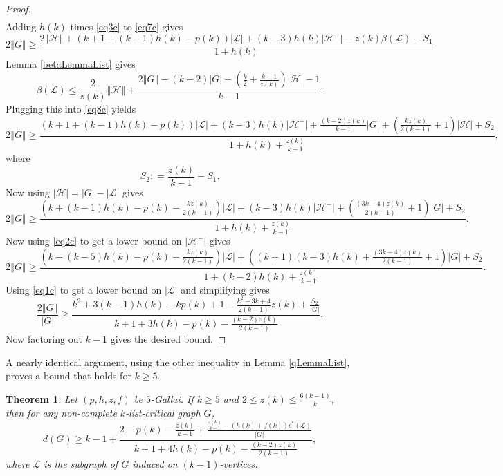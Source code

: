 \documentclass[10pt]{article}
\renewcommand{\ge}{\geqslant}
\renewcommand{\le}{\leqslant}
\theoremstyle{plain}
\newtheorem{thm}{Theorem}[section]
\theoremstyle{definition}
\theoremstyle{remark}
\newcommand{\fancy}[1]{\mathcal{#1}}
\renewcommand{\L}{\fancy{L}}
\newcommand{\HH}{\fancy{H}}
\newcommand{\card}[1]{\left|#1\right|}
\newcommand{\size}[1]{\left\Vert#1\right\Vert}
\newcommand{\parens}[1]{\left( #1 \right)}
\newcommand{\DefinedAs}{\mathrel{\mathop:}=}
\begin{document}
\begin{proof}
\begin{align*}
\end{align*}
Adding $h(k)$ times \eqref{eq3c} to \eqref{eq7c} gives
\begin{equation}\label{eq8c}
2\size{G} \ge \frac{2\size{\HH} + \parens{k+1 +(k-1)h(k)- p(k)}\card{\L} + (k- 3)h(k)\card{\HH^-}  - z(k)\beta(\L) - S_1}{1 + h(k)}
\end{equation}
Lemma \ref{betaLemmaList} gives
\[\beta(\L) \le \frac{2}{z(k)}\size{\HH} + \frac{2\size{G} - (k-2)\card{G} - \parens{\frac{k}{2} + \frac{k-1}{z(k)}}\card{\HH} - 1}{k-1}.\]
Plugging this into \eqref{eq8c} yields
\begin{equation}\label{eq9c}
2\size{G} \ge \frac{\parens{k+1 +(k-1)h(k)- p(k)}\card{\L} + (k- 3)h(k)\card{\HH^-} +\frac{(k-2)z(k)}{k-1}\card{G} + \parens{\frac{kz(k)}{2(k-1)} + 1}\card{\HH} + S_2}{1 + h(k) + \frac{z(k)}{k-1}},
\end{equation}
where
\[S_2 \DefinedAs \frac{z(k)}{k-1} - S_1.\]
Now using $\card{\HH} = \card{G} - \card{\L}$ gives
\begin{equation}\label{eq10c}
2\size{G} \ge \frac{\parens{k +(k-1)h(k)- p(k) - \frac{kz(k)}{2(k-1)}}\card{\L} + (k- 3)h(k)\card{\HH^-} + \parens{\frac{(3k-4)z(k)}{2(k-1)} + 1}\card{G} + S_2}{1 + h(k) + \frac{z(k)}{k-1}}.
\end{equation}
Now using \eqref{eq2c} to get a lower bound on $\card{\HH^-}$ gives
\begin{equation}\label{eq11c}
2\size{G} \ge \frac{\parens{k - (k-5)h(k)- p(k) - \frac{kz(k)}{2(k-1)}}\card{\L}+\parens{(k+1)(k-3)h(k) + \frac{(3k-4)z(k)}{2(k-1)} + 1}\card{G} + S_2}{1 + (k-2)h(k) + \frac{z(k)}{k-1}}.
\end{equation}
Using \eqref{eq1c} to get a lower bound on $\card{\L}$ and simplifying gives
\begin{equation}\label{eq12c}
\frac{2\size{G}}{\card{G}} \ge \frac{k^2 + 3(k-1)h(k) - kp(k) + 1 - \frac{k^2-3k+4}{2(k-1)}z(k) + \frac{S_2}{\card{G}}}{k+1 + 3h(k) - p(k) - \frac{(k-2)z(k)}{2(k-1)}}.
\end{equation}
Now factoring out $k-1$ gives the desired bound.
\end{proof}

\noindent A nearly identical argument, using the other inequality in Lemma \ref{qLemmaList}, proves a bound that holds for $k \ge 5$.

\begin{thm}\label{k5}
	Let $\parens{p,h,z,f}$ be $5$-Gallai.  If $k \ge 5$ and $2 \le z(k) \le \frac{6(k-1)}{k}$, then for any non-complete $k$-list-critical graph $G$,
	\[d(G) \ge k-1 + \frac{2 - p(k) - \frac{z(k)}{k-1} + \frac{\frac{z(k)}{k-1} - (h(k) + f(k))c^*(\L)}{\card{G}}}{k+1 + 4h(k) - p(k) - \frac{(k-2)z(k)}{2(k-1)}},\]
	where $\L$ is the subgraph of $G$ induced on $(k-1)$-vertices.
\end{thm}
\end{document}
